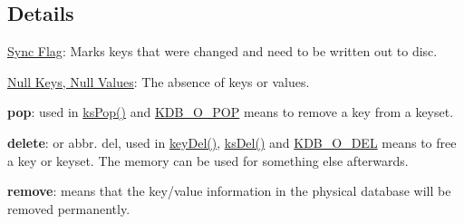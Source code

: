 \subsection*{Details}


\begin{DoxyItemize}
\item \hyperlink{doc_help_elektra-sync-flag_md}{Sync Flag}\+: Marks keys that were changed and need to be written out to disc.
\item \hyperlink{md_doc_help_elektra-values_doc_help_elektra-values_md}{Null Keys, Null Values}\+: The absence of keys or values.
\item {\bfseries pop}\+: used in {\ttfamily \hyperlink{group__keyset_gae42530b04defb772059de0600159cf69}{ks\+Pop()}} and \hyperlink{group__keyset_gga98a3d6a4016c9dad9cbd1a99a9c2a45aa52fb5f2cc86773d393da62bebebf7984}{K\+D\+B\+\_\+\+O\+\_\+\+P\+O\+P} means to remove a key from a keyset.
\item {\bfseries delete}\+: or abbr. del, used in {\ttfamily \hyperlink{group__key_ga3df95bbc2494e3e6703ece5639be5bb1}{key\+Del()}}, {\ttfamily \hyperlink{group__keyset_ga27e5c16473b02a422238c8d970db7ac8}{ks\+Del()}} and \hyperlink{group__keyset_gga98a3d6a4016c9dad9cbd1a99a9c2a45aa66a5380c120f25f28f49848c4a863ead}{K\+D\+B\+\_\+\+O\+\_\+\+D\+E\+L} means to free a key or keyset. The memory can be used for something else afterwards.
\item {\bfseries remove}\+: means that the key/value information in the physical database will be removed permanently. 
\end{DoxyItemize}